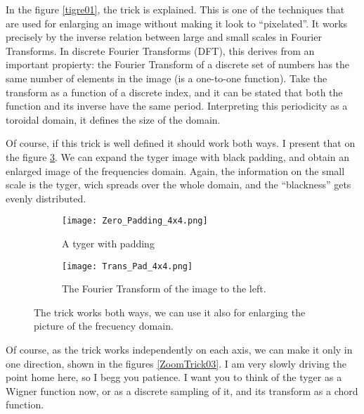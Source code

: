 \documentclass[a4paper,12pt]{article}
\begin{document}
In the figure \ref{tigre01}, the trick is explained.
This is one of the techniques that are used for enlarging
an image without making it look to ``pixelated''. 
It works precisely by the inverse relation between large and small
scales in Fourier Transforms. In discrete Fourier Transforms (DFT),
this derives from an important propierty: the Fourier Transform of
a discrete set of numbers has the same number of elements in the image
(is a one-to-one function).
Take the transform as a function of a discrete index, and it can be stated that
both the function and its inverse have the same period.
Interpreting this
periodicity as a toroidal domain, it defines the size of the domain.

Of course, if this trick is well defined it should work both ways.
I present that  on the figure \ref{ZoomTrick02}. We can
expand the tyger image with black padding, and obtain an enlarged image
of the frequencies domain. Again, the information on the
small scale is the tyger, wich spreads over the whole domain, and
the ``blackness'' gets evenly distributed. 

\begin{figure}[H]
  \centering
  \begin{subfigure}[b]{0.48\textwidth}
    \centering
          \texttt{[image: Zero\_Padding\_4x4.png]}
                \caption{A tyger with padding}
                \label{tigreynegro02}
  \end{subfigure}%
\begin{subfigure}[b]{0.48\textwidth}
    \centering
          \texttt{[image: Trans\_Pad\_4x4.png]}
                \caption{The Fourier Transform of the image to the left.}
                \label{ftigreynegro02}
  \end{subfigure}
\caption{ The trick works both ways, we can use it also for enlarging
the picture of the frecuency domain.
 }\label{ZoomTrick02}
\end{figure}

Of course, as the trick works independently on each axis, we can
make it only in one direction, shown in the figures \ref{ZoomTrick03}. 
I am very slowly driving the point home here,
so I begg you patience.
I want you to think of the tyger as a Wigner function now, or
as a discrete sampling of it, and its transform as a chord function.
  
\end{document}

